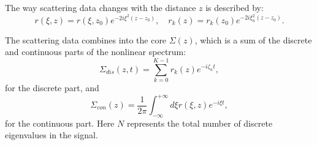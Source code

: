

The way scattering data changes with the distance \( z \) is described by:
\begin{equation}
    r(\xi,z) = r(\xi,z_0) e^{-2i \xi^2 (z - z_0)}, \quad 
    r_k(z) = r_k(z_0) e^{-2i \xi_n^2 (z - z_0)}.
\end{equation}

The scattering data combines into the core \( \Sigma (z) \), which is a sum of the discrete and continuous parts of the nonlinear spectrum:
\begin{equation}
    \Sigma_{dis}(z, t) = \sum_{k = 0}^{K - 1} r_k(z) e^{-i \zeta_n t},
    \label{eq:kernel_sol}
\end{equation}
for the discrete part, and
\begin{equation}
    \Sigma_{con}(z) = \frac{1}{2\pi} \int_{-\infty}^{+\infty} d\xi r(\xi, z) e^{-i \xi t},
    \label{eq:kernel_rad}
\end{equation}
for the continuous part. Here \( N \) represents the total number of discrete eigenvalues in the signal.

